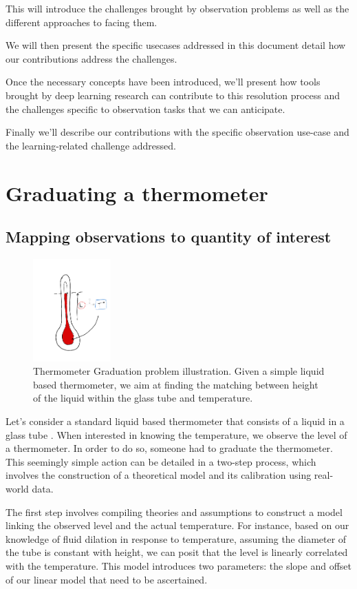 \begin{bibunit}
  This will introduce the challenges brought by observation problems as well as the different approaches to facing them.

  We will then present the specific usecases addressed in this document detail how our contributions address the challenges.

  Once the necessary concepts have been introduced, we'll present how tools brought by deep learning research can contribute to this resolution process and the challenges specific to observation tasks that we can anticipate.

  Finally we'll describe our contributions with the specific observation use-case and the learning-related challenge addressed. 
  
  \section{Graduating a thermometer}
\subsection{Mapping observations to quantity of interest}
\begin{figure}[h]
    \centering
        \includegraphics[clip, width=3cm]{Introduction/pics/therm_pb.png}
    \caption{Thermometer Graduation problem illustration. Given a simple liquid based thermometer, we aim at finding the matching between height of the liquid within the glass tube and temperature.}
    \label{fig:therm_calib}
\end{figure}

Let's consider a standard liquid based thermometer that consists of a liquid in a glass tube .
When interested in knowing the temperature, we observe the level of a thermometer.
In order to do so, someone had to graduate the thermometer. 
This seemingly simple action can be detailed in a two-step process, which involves the construction of a theoretical model and its calibration using real-world data.

The first step involves compiling theories and assumptions to construct a model linking the observed level and the actual temperature.
For instance, based on our knowledge of fluid dilation in response to temperature, assuming the diameter of the tube is constant with height, we can posit that the level is linearly correlated with the temperature.
This model introduces two parameters: the slope and offset of our linear model that need to be ascertained.


\end{bibunit}
